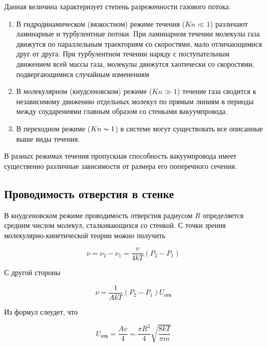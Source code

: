 \documentclass[a4paper,12pt]{article}
\begin{document}
Данная величина характеризует степень разреженности газового
потока:
\begin{enumerate}

	\item В гидродинамическом (вязкостном) режиме течения ($Kn \ll 1$)
различают ламинарные и турбулентные потоки. При ламинарном
течении молекулы газа движутся по параллельным траекториям
со скоростями, мало отличающимися друг от друга. При турбулентном течении наряду с поступательным движением всей массы газа, молекулы движутся хаотически со скоростями, подвергающимися случайным изменениям

	\item В молекулярном (кнудсеновском) режиме ($Kn \gg 1$) течение газа
сводится к независимому движению отдельных молекул по прямым линиям в периоды между соударениями главным образом со
стенками вакуумпровода.

	\item В переходном режиме ($Kn \thicksim 1$) в системе могут существовать все
описанные выше виды течения.

\end{enumerate}

В разных режимах течения пропускная способность вакуумпровода имеет существенно различные зависимости от размера его поперечного сечения.

\subsection{Проводимость отверстия в стенке}

В кнудсеновском режиме проводимость отверстия радиусом $R$
определяется средним числом молекул, сталкивающихся со стенкой. С точки зрения молекулярно-кинетической теории можно получить

\begin{equation}
	\nu = \nu_2 - \nu_1 = \frac{v}{4kT} (P_2 - P_1)
\end{equation}

С другой стороны 

\begin{equation}
	\nu = \frac{1}{AkT} (P_2 - P_1) U_{\text{отв}}
\end{equation}

Из формул слеудет, что

\begin{equation}
	U_{\text{{отв}}} = \frac{Av}{4} = \frac{\pi R^2}{4} \sqrt{\frac{8kT}{\pi m}}
\end{equation}
\end{document}
